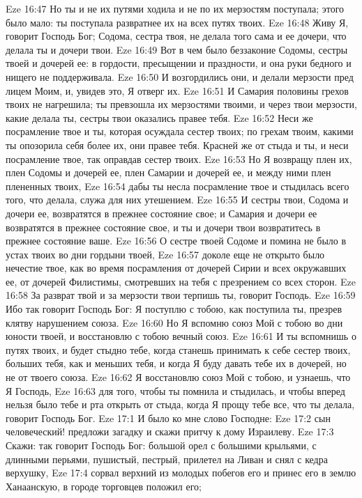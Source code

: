 Eze 16:47  Но ты и не их путями ходила и не по их мерзостям поступала; этого было мало: ты поступала развратнее их на всех путях твоих.
Eze 16:48  Живу Я, говорит Господь Бог; Содома, сестра твоя, не делала того сама и ее дочери, что делала ты и дочери твои.
Eze 16:49  Вот в чем было беззаконие Содомы, сестры твоей и дочерей ее: в гордости, пресыщении и праздности, и она руки бедного и нищего не поддерживала.
Eze 16:50  И возгордились они, и делали мерзости пред лицем Моим, и, увидев это, Я отверг их.
Eze 16:51  И Самария половины грехов твоих не нагрешила; ты превзошла их мерзостями твоими, и через твои мерзости, какие делала ты, сестры твои оказались правее тебя.
Eze 16:52  Неси же посрамление твое и ты, которая осуждала сестер твоих; по грехам твоим, какими ты опозорила себя более их, они правее тебя. Красней же от стыда и ты, и неси посрамление твое, так оправдав сестер твоих.
Eze 16:53  Но Я возвращу плен их, плен Содомы и дочерей ее, плен Самарии и дочерей ее, и между ними плен плененных твоих,
Eze 16:54  дабы ты несла посрамление твое и стыдилась всего того, что делала, служа для них утешением.
Eze 16:55  И сестры твои, Содома и дочери ее, возвратятся в прежнее состояние свое; и Самария и дочери ее возвратятся в прежнее состояние свое, и ты и дочери твои возвратитесь в прежнее состояние ваше.
Eze 16:56  О сестре твоей Содоме и помина не было в устах твоих во дни гордыни твоей,
Eze 16:57  доколе еще не открыто было нечестие твое, как во время посрамления от дочерей Сирии и всех окружавших ее, от дочерей Филистимы, смотревших на тебя с презрением со всех сторон.
Eze 16:58  За разврат твой и за мерзости твои терпишь ты, говорит Господь.
Eze 16:59  Ибо так говорит Господь Бог: Я поступлю с тобою, как поступила ты, презрев клятву нарушением союза.
Eze 16:60  Но Я вспомню союз Мой с тобою во дни юности твоей, и восстановлю с тобою вечный союз.
Eze 16:61  И ты вспомнишь о путях твоих, и будет стыдно тебе, когда станешь принимать к себе сестер твоих, больших тебя, как и меньших тебя, и когда Я буду давать тебе их в дочерей, но не от твоего союза.
Eze 16:62  Я восстановлю союз Мой с тобою, и узнаешь, что Я Господь,
Eze 16:63  для того, чтобы ты помнила и стыдилась, и чтобы вперед нельзя было тебе и рта открыть от стыда, когда Я прощу тебе все, что ты делала, говорит Господь Бог.
Eze 17:1  И было ко мне слово Господне:
Eze 17:2  сын человеческий! предложи загадку и скажи притчу к дому Израилеву.
Eze 17:3  Скажи: так говорит Господь Бог: большой орел с большими крыльями, с длинными перьями, пушистый, пестрый, прилетел на Ливан и снял с кедра верхушку,
Eze 17:4  сорвал верхний из молодых побегов его и принес его в землю Ханаанскую, в городе торговцев положил его;
